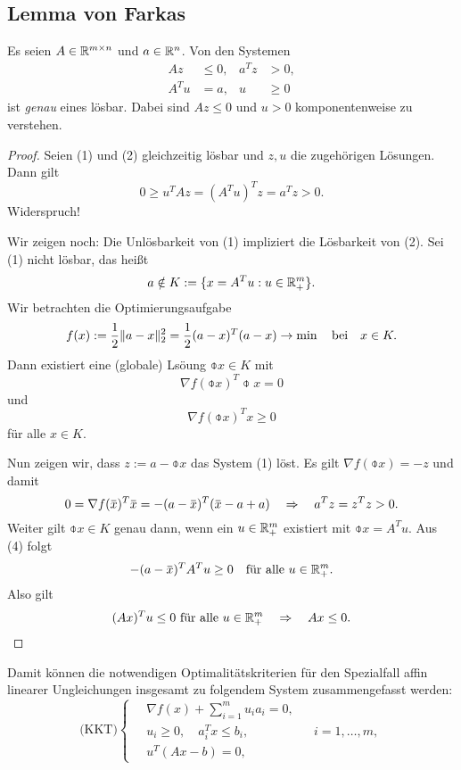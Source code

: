 \subsection{Lemma von Farkas}
\begin{lem}[Farkas] %
  Es seien $A \in \mathbb{R}^{m \times n}$ und $a \in \mathbb{R}^n$. Von den Systemen
  \begin{align*}
    Az &\le 0, & a^T z &> 0, \tag{1} \\
    A^T u &= a, & u &\ge 0 \tag{2}
  \end{align*}
  ist \emph{genau} eines lösbar. Dabei sind $A z \le 0$ und $u > 0$
  komponentenweise zu verstehen.
\end{lem}

\begin{proof}
  Seien (1) und (2) gleichzeitig lösbar und $z,u$ die zugehörigen Lösungen. Dann
  gilt
  \[ 0 \ge u^T A z = (A^T u)^T z = a^T z > 0. \]
  Widerspruch!

  Wir zeigen noch: Die Unlösbarkeit von (1) impliziert die Lösbarkeit von (2).
  Sei (1) nicht lösbar, das heißt
  \[ a \notin K := \{ x = A^T u : u \in \mathbb{R}^m_+ \}. \]
  Wir betrachten die Optimierungsaufgabe
  \[ f(x) := \frac{1}{2} \| a - x \|_2^2 = \frac{1}{2} (a-x)^T (a-x) \to \min \quad \text{bei} \quad x
    \in K. \]
  Dann existiert eine (globale) Lsöung $\obar{x} \in K$ mit
  \[ \nabla f(\obar{x})^T \obar{x} = 0 \tag{3}\]
  und
  \[ \nabla f(\obar{x})^T x \ge 0 \]
  für alle $x \in K$.

  Nun zeigen wir, dass $z := a - \obar{x}$ das System (1) löst. Es gilt
  $\nabla f( \obar{x} ) = -z$ und damit
  \[ 0 = \nabla f(\obar{x})^T \obar{x} = -(a-\obar{x})^T(\obar{x}-a+a)
    \qRq a^T z = z^T z > 0. \]
  Weiter gilt $\obar{x} \in K$ genau dann, wenn ein $u \in \mathbb{R}^m_+$ existiert
  mit $\obar{x} = A^T u$. Aus (4) folgt
  \[ -(a-\obar{x})^T A^T u \ge 0 \quad \text{für alle } u \in \real^m_+. \]
  Also gilt
  \[ (Ax)^T u \le 0 \text{ für alle } u \in \mathbb{R}^m_+ \quad \Rightarrow \quad Ax \le 0. \qedhere \]
\end{proof}

Damit können die notwendigen Optimalitätskriterien für den Spezialfall affin
linearer Ungleichungen insgesamt zu folgendem System zusammengefasst werden:
\begin{equation} %
  \text{(KKT)} \left\{ \quad \begin{aligned}
      \nabla f(x) + \sum_{i =1}^m u_i a_i = 0, & \\
      u_i \ge 0, \quad a_i^T x \le b_i, & &i = 1, \ldots, m, \\
      u^T(Ax - b) = 0, 
    \end{aligned} \right.
\end{equation}

